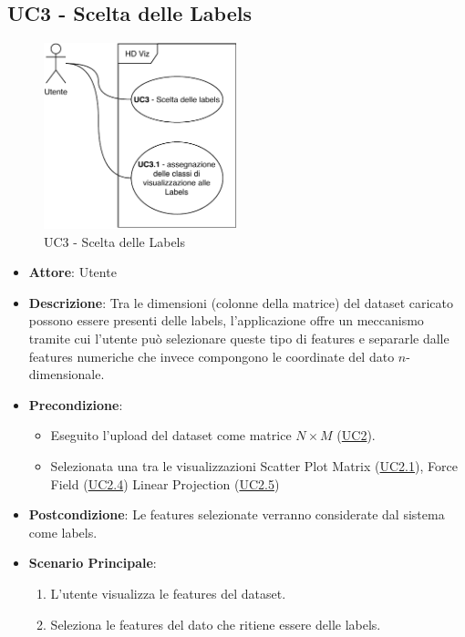 \subsection{UC3 - Scelta delle Labels}
\label{uc3}

    \begin{figure}[htbp]
        \centering
        \includegraphics[width=0.5\textwidth]{source/sections/casi-uso/diagrams/uc3.pdf}
        \caption{UC3 - Scelta delle Labels}
        \label{fig:uc3}
    \end{figure}


    \begin{itemize}
    \item \textbf{Attore}: Utente
    \item \textbf{Descrizione}: Tra le dimensioni (colonne della matrice) del dataset caricato possono essere presenti delle labels, l'applicazione offre un meccanismo tramite cui l'utente può selezionare queste tipo di features e separarle dalle features numeriche che invece compongono le coordinate del dato $n$-dimensionale.
    \item \textbf{Precondizione}:
    \begin{itemize}
        \item Eseguito l'upload del dataset come matrice $N\times M$ (\hyperref[uc2]{UC2}).
        \item Selezionata una tra le visualizzazioni Scatter Plot Matrix (\hyperref[uc2.1]{UC2.1}), Force Field (\hyperref[uc2.4]{UC2.4}) Linear Projection (\hyperref[uc2.5]{UC2.5})
    \end{itemize}
    \item \textbf{Postcondizione}: Le features selezionate verranno considerate dal sistema come labels.
    \item \textbf{Scenario Principale}: 
    \begin{enumerate}
        \item L'utente visualizza le features del dataset.
        \item Seleziona le features del dato che ritiene essere delle labels.
    \end{enumerate}  
    \end{itemize}
    
